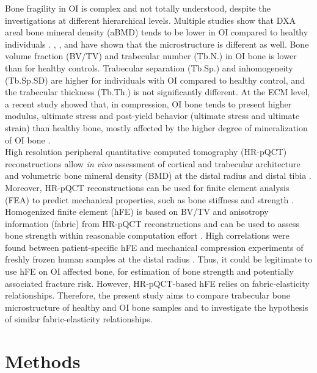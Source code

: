 \documentclass[a4paper,fleqn]{DC_ArtStyle}
\begin{document}
Bone fragility in OI is complex and not totally understood, despite the investigations at different hierarchical levels. Multiple studies show that DXA areal bone mineral density (aBMD) tends to be lower in OI compared to healthy individuals \cite{Folkestad2012,Lindahl2015,Scheres2018}.  \citeauthor{Folkestad2012}\cite{Folkestad2012}, \citeauthor{Kocijan2015}\cite{Kocijan2015}, and \citeauthor{Rolvien2018}\cite{Rolvien2018} have shown that the microstructure is different as well. Bone volume fraction (BV/TV) and trabecular number (Tb.N.) in OI bone is lower than for healthy controls. Trabecular separation (Tb.Sp.) and inhomogeneity (Tb.Sp.SD) are higher for individuals with OI compared to healthy control, and the trabecular thickness (Tb.Th.) is not significantly different. At the ECM level, a recent study showed that, in compression, OI bone tends to present higher modulus, ultimate stress and post-yield behavior (ultimate stress and ultimate strain) than healthy bone, mostly affected by the higher degree of mineralization of OI bone \cite{Indermaur2021}.\\

High resolution peripheral quantitative computed tomography (HR-pQCT) reconstructions allow \textit{in vivo} assessment of cortical and trabecular architecture and volumetric bone mineral density (BMD) at the distal radius and distal tibia \cite{Boutroy2005}. Moreover, HR-pQCT reconstructions can be used for finite element analysis (FEA) to predict mechanical properties, such as bone stiffness and strength \cite{Boutroy2008}. Homogenized finite element (hFE) is based on BV/TV and anisotropy information (fabric) from HR-pQCT reconstructions and can be used to assess bone strength within reasonable computation effort \cite{Pahr2009}. High correlations were found between patient-specific hFE and mechanical compression experiments of freshly frozen human samples at the distal radius \cite{Varga2011,AriasMoreno2019}. Thus, it could be legitimate to use hFE on OI affected bone, for estimation of bone strength and potentially associated fracture risk. However, HR-pQCT-based hFE relies on fabric-elasticity relationships. Therefore, the present study aims to compare trabecular bone microstructure of healthy and OI bone samples and to investigate the hypothesis of similar fabric-elasticity relationships.

\section{Methods}
\end{document}
